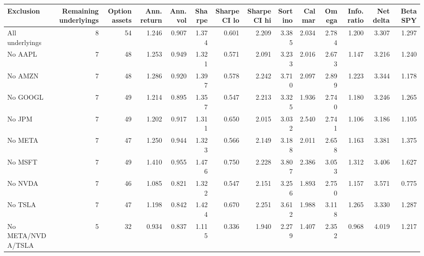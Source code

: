 \begin{tabular}{lrrrrrrrrrrrrr}
\toprule
Exclusion & Remaining underlyings & Option assets & Ann. return & Ann. vol & Sharpe & Sharpe CI lo & Sharpe CI hi & Sortino & Calmar & Omega & Info. ratio & Net delta & Beta SPY \\
\midrule
All underlyings & 8 & 54 & 1.246 & 0.907 & 1.374 & 0.601 & 2.209 & 3.385 & 2.034 & 2.784 & 1.200 & 3.307 & 1.297 \\
No AAPL & 7 & 48 & 1.253 & 0.949 & 1.321 & 0.571 & 2.091 & 3.233 & 2.016 & 2.673 & 1.147 & 3.216 & 1.240 \\
No AMZN & 7 & 48 & 1.286 & 0.920 & 1.397 & 0.578 & 2.242 & 3.710 & 2.097 & 2.899 & 1.223 & 3.344 & 1.178 \\
No GOOGL & 7 & 49 & 1.214 & 0.895 & 1.357 & 0.547 & 2.213 & 3.325 & 1.936 & 2.740 & 1.180 & 3.246 & 1.265 \\
No JPM & 7 & 49 & 1.202 & 0.917 & 1.311 & 0.650 & 2.015 & 3.032 & 2.540 & 2.741 & 1.106 & 3.186 & 1.105 \\
No META & 7 & 47 & 1.250 & 0.944 & 1.323 & 0.566 & 2.149 & 3.188 & 2.011 & 2.658 & 1.163 & 3.381 & 1.375 \\
No MSFT & 7 & 49 & 1.410 & 0.955 & 1.476 & 0.750 & 2.228 & 3.807 & 2.386 & 3.053 & 1.312 & 3.406 & 1.627 \\
No NVDA & 7 & 46 & 1.085 & 0.821 & 1.322 & 0.547 & 2.151 & 3.256 & 1.893 & 2.750 & 1.157 & 3.571 & 0.775 \\
No TSLA & 7 & 47 & 1.198 & 0.842 & 1.424 & 0.670 & 2.251 & 3.612 & 1.988 & 3.118 & 1.265 & 3.330 & 1.287 \\
No META/NVDA/TSLA & 5 & 32 & 0.934 & 0.837 & 1.115 & 0.336 & 1.940 & 2.279 & 1.407 & 2.352 & 0.968 & 4.019 & 1.217 \\
\bottomrule
\end{tabular}
